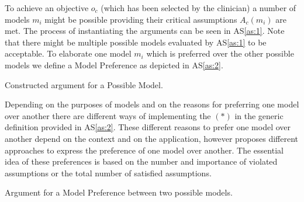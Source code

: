 To achieve an objective $o_c$ (which has been selected by the clinician) a number of models $m_i$ might be possible providing their critical assumptions $A_c(m_i)$ are met. The process of instantiating the arguments can be seen in AS\autoref{as:1}. Note that there might be multiple possible models evaluated by AS\ref{as:1} to be acceptable. To elaborate one model $m_i$ which is preferred over the other possible models we define a Model Preference as depicted in AS\ref{as:2}.

\begin{AS}[h]
\centering
	\caption{Constructed argument for a Possible Model.\label{as:1}}
\end{AS}

Depending on the purposes of models and on the reasons for preferring one model over another there are different ways of implementing the $(\ast)$ in the generic definition provided in AS\ref{as:2}. These different reasons to prefer one model over another depend on the context and on the application, however \cite{sassoon2014} proposes different approaches to express the preference of one model over another. The essential idea of these preferences is based on the number and importance of violated assumptions or the total number of satisfied assumptions. 

\begin{AS}[h]
\centering
	\caption{Argument for a Model Preference between two possible models.\label{as:2}}

\end{AS}

